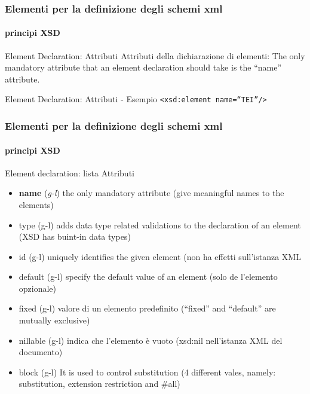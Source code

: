 \begin{frame}
	\frametitle{Elementi per la definizione degli schemi xml}
	\framesubtitle{principi XSD}
	\addtocounter{nframe}{1}

	\begin{block}{Element Declaration: Attributi}
		Attributi della dichiarazione di elementi: The only mandatory attribute that an element declaration should take is the ``name'' attribute.
	\end{block}

	\begin{block}{Element Declaration: Attributi - Esempio}
		\texttt{<xsd:element name=``TEI''/> }
	\end{block}

\end{frame}

\begin{frame}
	\frametitle{Elementi per la definizione degli schemi xml}
	\framesubtitle{principi XSD}
	\addtocounter{nframe}{1}

	\begin{block}{Element declaration: lista Attributi}
		\begin{itemize}
			\item \textbf{name} (\textit{g-l}) the only mandatory attribute (give meaningful names to the elements)
			\item type (g-l) adds data type related validations to the declaration of an element (XSD has buint-in data types)
			\item id (g-l) uniquely identifies the given element (non ha effetti sull'istanza XML
			\item default (g-l) specify the default value of an element (solo de l'elemento opzionale)
			\item fixed (g-l) valore di un elemento predefinito (``fixed'' and ``default'' are mutually exclusive)
			\item nillable (g-l) indica che l'elemento è vuoto (xsd:nil nell'istanza XML del documento)
			\item block (g-l) It is used to control substitution (4 different vales, namely: substitution, extension restriction and \#all)
		\end{itemize}

	\end{block}

\end{frame}


